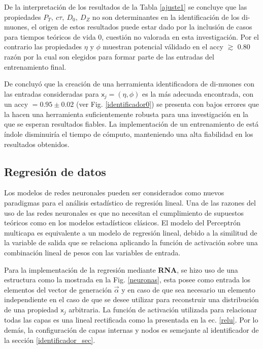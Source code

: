 De la interpretación de los resultados de la Tabla \ref{ajuste1} se concluye que las propiedades $P_T, ~ c\tau, ~ D_0, ~D_Z$ no son determinantes en la identificación de los di-muones, el origen de estos resultados puede estar dado por la inclusión de casos para tiempos teóricos de vida 0, cuestión no valorada en esta investigación. Por el contrario las propiedades $\eta$ y $\phi$ muestran potencial válidado en el \textsf{accy} $\gtrsim$ 0.80 razón por la cual son elegidos para formar parte de las entradas del entrenamiento final. 

De concluyó que la creación de una herramienta identificadora de di-muones con las entradas consideradas para $\textsf{x}_j=(\eta,\phi)$ es la más adecuada encontrada, con un \textsf{accy} $= 0.95 \pm 0.02$ (ver Fig. \ref{identificador0}) se presenta con bajos errores que la hacen una herramienta suficientemente robusta para una investigación en la que se esperan resultados fiables. La implementación de un entrenamiento de está índole disminuiría el tiempo de cómputo, manteniendo una alta fiabilidad en los resultados obtenidos.


\subsection{Regresión de datos}

Los modelos de redes neuronales pueden ser considerados como nuevos paradigmas para el análisis estadístico de regresión lineal. Una de las razones del uso de las redes neuronales es que no necesitan el cumplimiento de supuestos teóricos como en los modelos estadísticos clásicos. El modelo del Perceptrón multicapa es equivalente a un modelo de regresión lineal, debido a la similitud de la variable de salida que se relaciona aplicando la función de activación sobre una combinación lineal de pesos con las variables de entrada. 

Para la implementación de la regresión mediante \textbf{RNA}, se hizo uso de una estructura como la mostrada en la Fig. \ref{neuronas}, esta posee como entrada los elementos del vector de generación $\vec{\alpha}$ y en caso de que sea necesario un elemento independiente en el caso de que se desee utilizar para reconstruir una distribución de una propiedad $\textsf{x}_j$ arbitraria. La función de activación utilizada para relacionar todas las capas es una lineal rectificada  como la presentada en la ec. \ref{relu}. Por lo demás, la configuración de capas internas y nodos es semejante al identificador de la sección \ref{identificador_sec}.%

